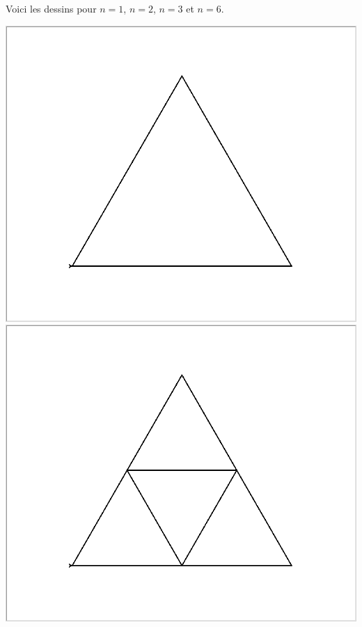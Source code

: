 \documentclass[11pt,class=report,crop=false]{standalone}
\begin{document}
\begin{activite}
\begin{enumerate}
   Voici les dessins pour $n=1$, $n=2$, $n=3$ et $n=6$.
  
  \begin{center}
\includegraphics[scale=\myscale,scale=0.14]{ecran_tortue_sierp1}\quad 
\includegraphics[scale=\myscale,scale=0.14]{ecran_tortue_sierp2}\quad

\end{center}
\end{enumerate}
\end{activite}
\end{document}
